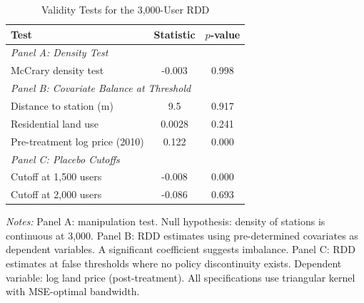 \begin{table}[t]
\centering
\caption{Validity Tests for the 3,000-User RDD}
\label{tab:validity}
\begin{tabular}{lcc}
\hline\hline
Test & Statistic & $p$-value \\
\hline
\multicolumn{3}{l}{\textit{Panel A: Density Test}} \\
McCrary density test & -0.003 & 0.998 \\
[6pt]
\multicolumn{3}{l}{\textit{Panel B: Covariate Balance at Threshold}} \\
Distance to station (m) & 9.5 & 0.917 \\
Residential land use & 0.0028 & 0.241 \\
Pre-treatment log price (2010) & 0.122 & 0.000 \\
[6pt]
\multicolumn{3}{l}{\textit{Panel C: Placebo Cutoffs}} \\
Cutoff at 1,500 users & -0.008 & 0.000 \\
Cutoff at 2,000 users & -0.086 & 0.693 \\
\hline\hline
\end{tabular}
\begin{tablenotes}
\item \textit{Notes:} Panel A: \citet{cattaneo2020density} manipulation test. Null hypothesis: density of stations is continuous at 3,000. Panel B: RDD estimates using pre-determined covariates as dependent variables. A significant coefficient suggests imbalance. Panel C: RDD estimates at false thresholds where no policy discontinuity exists. Dependent variable: log land price (post-treatment). All specifications use triangular kernel with MSE-optimal bandwidth.
\end{tablenotes}
\end{table}

